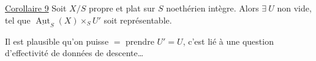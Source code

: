 \uline{Corollaire 9} Soit $X/S$ propre et plat sur $S$ noethérien intègre. Alors $\exists\ U$ non vide,   tel que $\underline{\operatorname{Aut}}_S(X)\times_S U'$ soit représentable.

Il est plausible qu'on puisse $=$ prendre $U'=U$, c'est lié à une question d'effectivité de données de descente\ldots
{}
